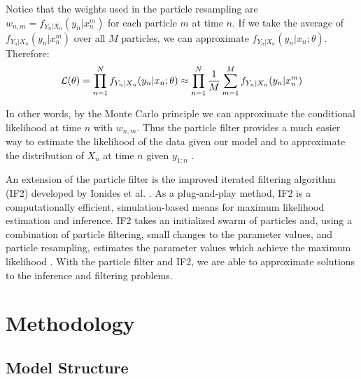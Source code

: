 \documentclass[12pt]{article}
\begin{document}
    Notice that the weights used in the particle resampling are $w_{n,m} = f_{Y_n|X_n}(y_n | x_n^m)$ for each particle $m$ at time $n$. If we take the average of $f_{Y_n|X_n}(y_n | x_n^m)$ over all $M$ particles, we can approximate $f_{Y_n|X_n}(y_n | x_n; \theta)$. Therefore: 
    \begin{equation}
    \mathcal{L}(\theta) = \prod_{n=1}^N f_{Y_n | X_n}(y_n | x_n; \theta) \approx \prod_{n=1}^N \frac{1}{M} \sum_{m = 1}^M f_{Y_n|X_n}(y_n | x_n^m) \\
    \end{equation}
   
    In other words, by the Monte Carlo principle we can approximate the conditional likelihood at time $n$ with $w_{n,m}$. Thus the particle filter provides a much easier way to estimate the likelihood of the data given our model and to approximate the distribution of $X_{n}$ at time $n$ given $y_{1:n}$ \cite{King_statinfpomp, Ionides_infpomp, Ionides_if}.
  
  An extension of the particle filter is the improved iterated filtering algorithm (IF2) developed by Ionides et al. \cite{Ionides_infdynsys}. As a plug-and-play method, IF2 is a computationally efficient, simulation-based means for maximum likelihood estimation and inference. IF2 takes an initialized swarm of particles and, using a combination of particle filtering, small changes to the parameter values, and particle resampling, estimates the parameter values which achieve the maximum likelihood \cite{Ionides_infpomp}. With the particle filter and IF2, we are able to approximate solutions to the inference and filtering problems. 
  
\section{Methodology}
\subsection{Model Structure}

\end{document}

